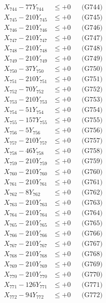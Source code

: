\documentclass[a4paper,10pt]{article}
\begin{document}
{\begin{align}
X_{744} - 77Y_{744} &\leq +0 && \text{(G744)} \\
X_{745} - 210Y_{745} &\leq +0 && \text{(G745)} \\
X_{746} - 210Y_{746} &\leq +0 && \text{(G746)} \\
X_{747} - 210Y_{747} &\leq +0 && \text{(G747)} \\
X_{748} - 210Y_{748} &\leq +0 && \text{(G748)} \\
X_{749} - 210Y_{749} &\leq +0 && \text{(G749)} \\
X_{750} - 37Y_{750} &\leq +0 && \text{(G750)} \\
\allowbreak
X_{751} - 210Y_{751} &\leq +0 && \text{(G751)} \\
X_{752} - 70Y_{752} &\leq +0 && \text{(G752)} \\
X_{753} - 210Y_{753} &\leq +0 && \text{(G753)} \\
X_{754} - 51Y_{754} &\leq +0 && \text{(G754)} \\
X_{755} - 157Y_{755} &\leq +0 && \text{(G755)} \\
X_{756} - 5Y_{756} &\leq +0 && \text{(G756)} \\
X_{757} - 210Y_{757} &\leq +0 && \text{(G757)} \\
X_{758} - 46Y_{758} &\leq +0 && \text{(G758)} \\
X_{759} - 210Y_{759} &\leq +0 && \text{(G759)} \\
X_{760} - 210Y_{760} &\leq +0 && \text{(G760)} \\
\allowbreak
X_{761} - 210Y_{761} &\leq +0 && \text{(G761)} \\
X_{762} - 8Y_{762} &\leq +0 && \text{(G762)} \\
X_{763} - 210Y_{763} &\leq +0 && \text{(G763)} \\
X_{764} - 210Y_{764} &\leq +0 && \text{(G764)} \\
X_{765} - 210Y_{765} &\leq +0 && \text{(G765)} \\
X_{766} - 210Y_{766} &\leq +0 && \text{(G766)} \\
X_{767} - 210Y_{767} &\leq +0 && \text{(G767)} \\
X_{768} - 210Y_{768} &\leq +0 && \text{(G768)} \\
X_{769} - 210Y_{769} &\leq +0 && \text{(G769)} \\
X_{770} - 210Y_{770} &\leq +0 && \text{(G770)} \\
\allowbreak
X_{771} - 126Y_{771} &\leq +0 && \text{(G771)} \\
X_{772} - 94Y_{772} &\leq +0 && \text{(G772)} \\

\end{align}}
\end{document}

